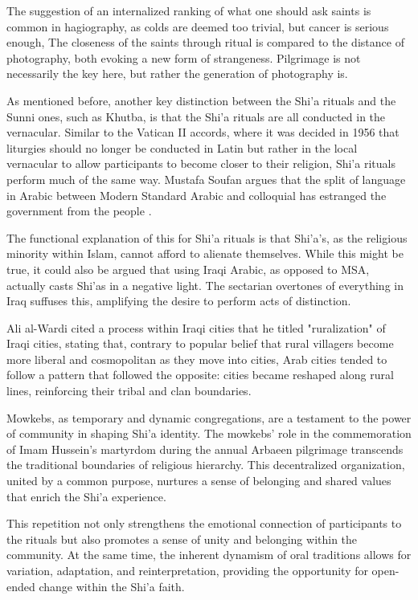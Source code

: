 The suggestion of an internalized ranking of what one should ask saints is common in hagiography, as colds are deemed too trivial, but cancer is serious enough, The closeness of the saints through ritual is compared to the distance of photography, both evoking a new form of strangeness. Pilgrimage is not necessarily the key here, but rather the generation of photography is. 

As mentioned before, another key distinction between the Shi'a rituals and the Sunni ones, such as Khutba, is that the Shi'a rituals are all conducted in the vernacular. Similar to the Vatican II accords, where it was decided in 1956 that liturgies should no longer be conducted in Latin but rather in the local vernacular to allow participants to become closer to their religion, Shi'a rituals perform much of the same way. Mustafa Soufan argues that the split of language in Arabic between Modern Standard Arabic and colloquial has estranged the government from the people \cite{safouan_why_2007}. 

The functional explanation of this for Shi'a rituals is that Shi'a’s, as the religious minority within Islam, cannot afford to alienate themselves. While this might be true, it could also be argued that using Iraqi Arabic, as opposed to MSA, actually casts Shi'as in a negative light. The sectarian overtones of everything in Iraq suffuses this, amplifying the desire to perform acts of distinction. 

Ali al-Wardi cited a process within Iraqi cities that he titled "ruralization" of Iraqi cities, stating that, contrary to popular belief that rural villagers become more liberal and cosmopolitan as they move into cities, Arab cities tended to follow a pattern that followed the opposite: cities became reshaped along rural lines, reinforcing their tribal and clan boundaries.

Mowkebs, as temporary and dynamic congregations, are a testament to the power of community in shaping Shi'a identity. The mowkebs' role in the commemoration of Imam Hussein's martyrdom during the annual Arbaeen pilgrimage transcends the traditional boundaries of religious hierarchy. This decentralized organization, united by a common purpose, nurtures a sense of belonging and shared values that enrich the Shi'a experience.

This repetition not only strengthens the emotional connection of participants to the rituals but also promotes a sense of unity and belonging within the community. At the same time, the inherent dynamism of oral traditions allows for variation, adaptation, and reinterpretation, providing the opportunity for open-ended change within the Shi'a faith.


